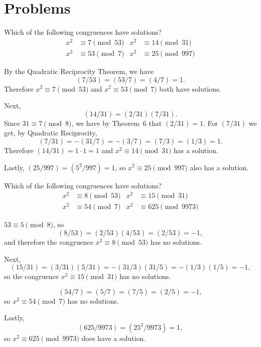 \section{Problems}

\label{problem:quad-cong:sample1}
Which of the following congruences have solutions?
\begin{align*}
  x^2 &\equiv 7\pmod{53} & x^2 &\equiv 14\pmod{31} \\
  x^2 &\equiv 53\pmod{7} & x^2 &\equiv 25\pmod{997}
\end{align*}
\begin{solution}
  By the Quadratic Reciprocity Theorem, we have
  \begin{equation*}
    (7/53) = (53/7) = (4/7) = 1.
  \end{equation*}
  Therefore $x^2\equiv7\pmod{53}$ and $x^2\equiv53\pmod7$ both have
  solutions.

  Next,
  \begin{equation*}
    (14/31) = (2/31)(7/31).
  \end{equation*}
  Since $31\equiv7\pmod8$, we have by Theorem~6 that $(2/31) = 1$. For
  $(7/31)$ we get, by Quadratic Reciprocity,
  \begin{equation*}
    (7/31) = -(31/7) = -(3/7) = (7/3) = (1/3) = 1.
  \end{equation*}
  Therefore $(14/31) = 1\cdot1 = 1$ and $x^2\equiv14\pmod{31}$ has a
  solution.

  Lastly, $(25/997) = (5^2/997) = 1$, so $x^2\equiv25\pmod{997}$ also
  has a solution.
\end{solution}

\label{problem:quad-cong:sample2}
Which of the following congruences have solutions?
\begin{align*}
  x^2 &\equiv 8 \pmod{53} & x^2 &\equiv 15\pmod{31} \\
  x^2 &\equiv 54 \pmod7 & x^2 &\equiv 625\pmod{9973}
\end{align*}
\begin{solution}
  $53\equiv5\pmod8$, so
  \begin{equation*}
    (8/53) = (2/53)(4/53) = (2/53) = -1,
  \end{equation*}
  and therefore the congruence $x^2\equiv8\pmod{53}$ has no solutions.

  Next,
  \begin{equation*}
    (15/31) = (3/31)(5/31) = -(31/3)(31/5)
    = -(1/3)(1/5) = -1,
  \end{equation*}
  so the congruence $x^2\equiv15\pmod{31}$ has no solutions.

  \begin{equation*}
    (54/7) = (5/7) = (7/5) = (2/5) = -1,
  \end{equation*}
  so $x^2\equiv54\pmod7$ has no solutions.

  Lastly,
  \begin{equation*}
    (625/9973) = (25^2/9973) = 1,
  \end{equation*}
  so $x^2\equiv625\pmod{9973}$ does have a solution.
\end{solution}

